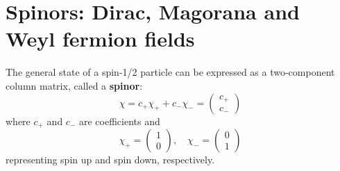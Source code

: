 \documentclass[12pt]{report}
\begin{document}
\section{Spinors: Dirac, Magorana and Weyl fermion fields}
The general state of a spin-1/2 particle can be expressed as a two-component column matrix, called a \textbf{spinor}:
\begin{equation}
\chi = c_{+} \chi_{+} + c_{-} \chi_{-} = \left(\begin{array}{c}c_{+} \\c_{-}\end{array}\right)
\end{equation}
where $c_{+}$ and $c_{-}$ are coefficients and 
\begin{equation}
\chi_{+} = \left(\begin{array}{c}1 \\0\end{array}\right), \quad 
\chi_{-} = \left(\begin{array}{c}0 \\1\end{array}\right)
\end{equation}
representing spin up and spin down, respectively.
\end{document}
